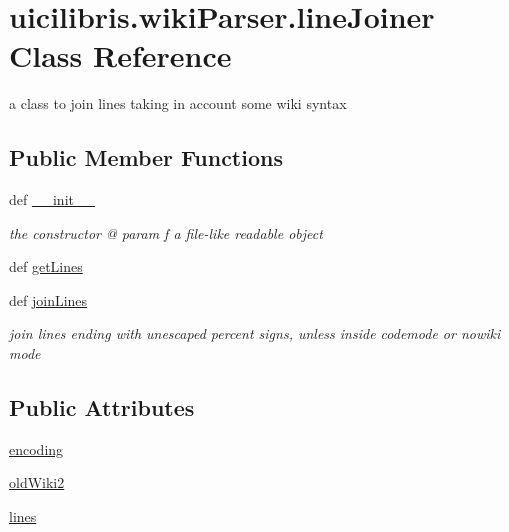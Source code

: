 \hypertarget{classuicilibris_1_1wikiParser_1_1lineJoiner}{\section{uicilibris.\-wiki\-Parser.\-line\-Joiner \-Class \-Reference}
\label{classuicilibris_1_1wikiParser_1_1lineJoiner}
}


a class to join lines taking in account some wiki syntax  


\subsection*{\-Public \-Member \-Functions}
\begin{DoxyCompactItemize}
\item 
def \hyperlink{classuicilibris_1_1wikiParser_1_1lineJoiner_a5e013b804de3f6482d203fc10c3bcc3e}{\-\_\-\-\_\-init\-\_\-\-\_\-}
\begin{DoxyCompactList}\small\item\em the constructor @ param f a file-\/like readable object \end{DoxyCompactList}\item 
def \hyperlink{classuicilibris_1_1wikiParser_1_1lineJoiner_aef5495971e8512ad4e86be06b751ac0e}{get\-Lines}
\item 
def \hyperlink{classuicilibris_1_1wikiParser_1_1lineJoiner_a3e2015b6de4918bc0fd23974fd270723}{join\-Lines}
\begin{DoxyCompactList}\small\item\em join lines ending with unescaped percent signs, unless inside codemode or nowiki mode \end{DoxyCompactList}\end{DoxyCompactItemize}
\subsection*{\-Public \-Attributes}
\begin{DoxyCompactItemize}
\item 
\hyperlink{classuicilibris_1_1wikiParser_1_1lineJoiner_a6f256454bdf66e5bc7092b2e5e35e309}{encoding}
\item 
\hyperlink{classuicilibris_1_1wikiParser_1_1lineJoiner_af17fcd2f320eca11d8d790d4842a4b7e}{old\-Wiki2}
\item 
\hyperlink{classuicilibris_1_1wikiParser_1_1lineJoiner_ac880296b5451530bdb53f9ee85f8d1ee}{lines}
\end{DoxyCompactItemize}


